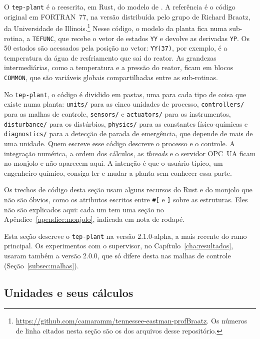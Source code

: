 O \texttt{tep-plant} é a reescrita, em Rust, do modelo de . A referência é o código original em FORTRAN~77, na versão distribuída pelo grupo de Richard Braatz, da Universidade de Illinois.\footnote{\url{https://github.com/camaramm/tennessee-eastman-profBraatz}. Os números de linha citados nesta seção são os dos arquivos desse repositório.} Nesse código, o modelo da planta fica numa sub-rotina, a \texttt{TEFUNC}, que recebe o vetor de estados \texttt{YY} e devolve as derivadas \texttt{YP}. Os 50 estados são acessados pela posição no vetor: \texttt{YY(37)}, por exemplo, é a temperatura da água de resfriamento que sai do reator. As grandezas intermediárias, como a temperatura e a pressão do reator, ficam em blocos \texttt{COMMON}, que são variáveis globais compartilhadas entre as sub-rotinas.

No \texttt{tep-plant}, o código é dividido em pastas, uma para cada tipo de coisa que existe numa planta: \texttt{units/} para as cinco unidades de processo, \texttt{controllers/} para as malhas de controle, \texttt{sensors/} e \texttt{actuators/} para os instrumentos, \texttt{disturbance/} para os distúrbios, \texttt{physics/} para as constantes físico-químicas e \texttt{diagnostics/} para a detecção de parada de emergência, que depende de mais de uma unidade. Quem escreve esse código descreve o processo e o controle. A integração numérica, a ordem dos cálculos, as \textit{threads} e o servidor OPC~UA ficam no monjolo e não aparecem aqui. A intenção é que o usuário típico, um engenheiro químico, consiga ler e mudar a planta sem conhecer essa parte.

Os trechos de código desta seção usam alguns recursos do Rust e do monjolo que não são óbvios, como os atributos escritos entre \texttt{\#[} e \texttt{]} sobre as estruturas. Eles não são explicados aqui: cada um tem uma seção no Apêndice~\ref{apendice:monjolo}, indicada em nota de rodapé.

Esta seção descreve o \texttt{tep-plant} na versão 2.1.0-alpha, a mais recente do ramo principal. Os experimentos com o supervisor, no Capítulo~\ref{cha:resultados}, usaram também a versão 2.0.0, que só difere desta nas malhas de controle (Seção~\ref{subsec:malhas}).

\subsection{Unidades e seus cálculos}
\label{subsec:unidades}

